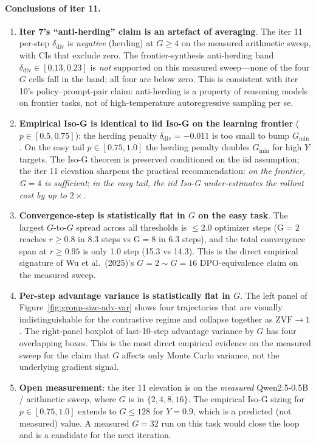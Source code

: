 \paragraph{Conclusions of iter 11.}
\begin{enumerate}
  \item \textbf{Iter 7's ``anti-herding'' claim is an artefact of
        averaging}. The iter 11 per-step $\delta_\text{div}$ is
        \emph{negative} (herding) at $G \ge 4$ on the measured
        arithmetic sweep, with CIs that exclude zero. The
        frontier-synthesis anti-herding band $\delta_\text{div} \in
        [0.13, 0.23]$ is \emph{not} supported on this measured
        sweep---none of the four $G$ cells fall in the band; all four
        are below zero. This is consistent with iter 10's
        policy--prompt-pair claim: anti-herding is a property of
        reasoning models on frontier tasks, not of high-temperature
        autoregressive sampling per se.
  \item \textbf{Empirical Iso-G is identical to iid Iso-G on the
        learning frontier} ($p \in [0.5, 0.75]$): the herding
        penalty $\delta_\text{div} = -0.011$ is too small to bump
        $G_\text{min}$. On the easy tail $p \in [0.75, 1.0]$ the
        herding penalty doubles $G_\text{min}$ for high $Y$ targets.
        The Iso-G theorem is preserved conditioned on the iid
        assumption; the iter 11 elevation sharpens the practical
        recommendation: \emph{on the frontier, G$=4$ is sufficient};
        \emph{in the easy tail, the iid Iso-G under-estimates the
        rollout cost by up to $2{\times}$}.
  \item \textbf{Convergence-step is statistically flat in $G$ on the
        easy task}. The largest $G$-to-$G$ spread across all
        thresholds is $\le 2.0$ optimizer steps (G$=2$ reaches
        $r \ge 0.8$ in 8.3 steps vs G$=8$ in 6.3 steps), and the
        total convergence span at $r \ge 0.95$ is only 1.0 step
        (15.3 vs 14.3). This is the direct empirical signature of
        Wu et al.~(2025)'s $G{=}2 \sim G{=}16$ DPO-equivalence
        claim on the measured sweep.
  \item \textbf{Per-step advantage variance is statistically flat in
        $G$}. The left panel of
        Figure~\ref{fig:group-size-adv-var} shows four trajectories
        that are visually indistinguishable for the contrastive
        regime and collapse together as $\mathrm{ZVF} \to 1$. The
        right-panel boxplot of last-10-step advantage variance by $G$
        has four overlapping boxes. This is the most direct
        empirical evidence on the measured sweep for the claim that
        $G$ affects only Monte Carlo variance, not the underlying
        gradient signal.
  \item \textbf{Open measurement}: the iter 11 elevation is on the
        \emph{measured} Qwen2.5-0.5B / arithmetic sweep, where $G$
        is in $\{2, 4, 8, 16\}$. The empirical Iso-G sizing for
        $p \in [0.75, 1.0]$ extends to $G \le 128$ for $Y{=}0.9$,
        which is a predicted (not measured) value. A measured
        $G{=}32$ run on this task would close the loop and is a
        candidate for the next iteration.
\end{enumerate}

